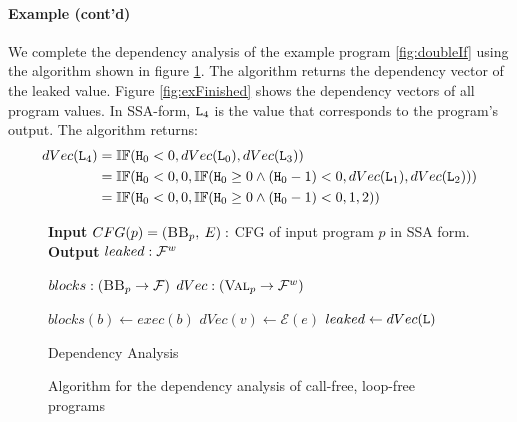 \paragraph{Example (cont'd)}
We complete the dependency analysis of the example program \ref{fig:doubleIf} using the algorithm shown in figure \ref{alg:depAna}. The algorithm returns the dependency vector of the leaked value. Figure \ref{fig:exFinished} shows the dependency vectors of all program values. In SSA-form, $\mathtt{L}_4$ is the value that corresponds to the program's output. The algorithm returns:
\begin{align*}
    dVec(\mathtt{L}_4) &= \mathbb{IF}(\mathtt{H}_0 < 0, dVec(\mathtt{L}_0), dVec(\mathtt{L}_3)) \\
    &= \mathbb{IF}(\mathtt{H}_0 < 0, 0, \mathbb{IF}(\mathtt{H}_0 \geq 0 \land (\mathtt{H}_0 - 1) < 0, dVec(\mathtt{L}_1), dVec(\mathtt{L}_2))) \\
    &= \mathbb{IF}(\mathtt{H}_0 < 0, 0, \mathbb{IF}(\mathtt{H}_0 \geq 0 \land (\mathtt{H}_0 - 1) < 0, 1, 2))
\end{align*}

\begin{figure}
    \centering
    \begin{algorithm}[H]
        \hspace*{\algorithmicindent} \textbf{Input} $CFG(p) = (\mbb_p, \: E):$ CFG of input program $p$ in SSA form.\\ 
        \hspace*{\algorithmicindent} \textbf{Output} $leaked: \mathcal{F}^w$\\
        \begin{algorithmic}[1]
            \State $blocks: (\mbb_p \to \mbform)$
            \State $dVec: (\textsc{Val}_p \to \mathcal{F}^w)$
            
                \State $blocks(b) \leftarrow exec(b)$
                    \State $dVec(v) \leftarrow \mathcal{E}(e)$
                \EndFor
            \EndFor
            \State $leaked \leftarrow dVec(\mathtt{L})$
    \end{algorithmic} 
    \caption{Dependency Analysis}
\end{algorithm}
    \caption{Algorithm for the dependency analysis of call-free, loop-free programs}
    \label{alg:depAna}
\end{figure}


